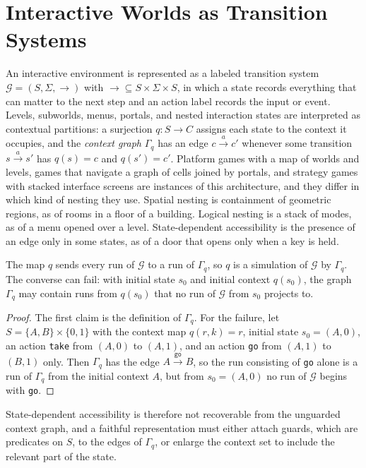 \section{Interactive Worlds as Transition Systems}

An interactive environment is represented as a labeled transition system $\mathcal G=(S,\Sigma,\longrightarrow)$ with $\longrightarrow\subseteq S\times\Sigma\times S$, in which a state records everything that can matter to the next step and an action label records the input or event. Levels, subworlds, menus, portals, and nested interaction states are interpreted as contextual partitions: a surjection $q:S\to C$ assigns each state to the context it occupies, and the \emph{context graph} $\Gamma_q$ has an edge $c\xrightarrow{a}c'$ whenever some transition $s\xrightarrow{a}s'$ has $q(s)=c$ and $q(s')=c'$. Platform games with a map of worlds and levels, games that navigate a graph of cells joined by portals, and strategy games with stacked interface screens are instances of this architecture, and they differ in which kind of nesting they use. Spatial nesting is containment of geometric regions, as of rooms in a floor of a building. Logical nesting is a stack of modes, as of a menu opened over a level. State-dependent accessibility is the presence of an edge only in some states, as of a door that opens only when a key is held.

\begin{proposition}\label{prop:overapprox}
The map $q$ sends every run of $\mathcal G$ to a run of $\Gamma_q$, so $q$ is a simulation of $\mathcal G$ by $\Gamma_q$. The converse can fail: with initial state $s_0$ and initial context $q(s_0)$, the graph $\Gamma_q$ may contain runs from $q(s_0)$ that no run of $\mathcal G$ from $s_0$ projects to.
\end{proposition}
\begin{proof}
The first claim is the definition of $\Gamma_q$. For the failure, let $S=\{A,B\}\times\{0,1\}$ with the context map $q(r,k)=r$, initial state $s_0=(A,0)$, an action \texttt{take} from $(A,0)$ to $(A,1)$, and an action \texttt{go} from $(A,1)$ to $(B,1)$ only. Then $\Gamma_q$ has the edge $A\xrightarrow{\texttt{go}}B$, so the run consisting of \texttt{go} alone is a run of $\Gamma_q$ from the initial context $A$, but from $s_0=(A,0)$ no run of $\mathcal G$ begins with \texttt{go}.
\end{proof}

State-dependent accessibility is therefore not recoverable from the unguarded context graph, and a faithful representation must either attach guards, which are predicates on $S$, to the edges of $\Gamma_q$, or enlarge the context set to include the relevant part of the state.

